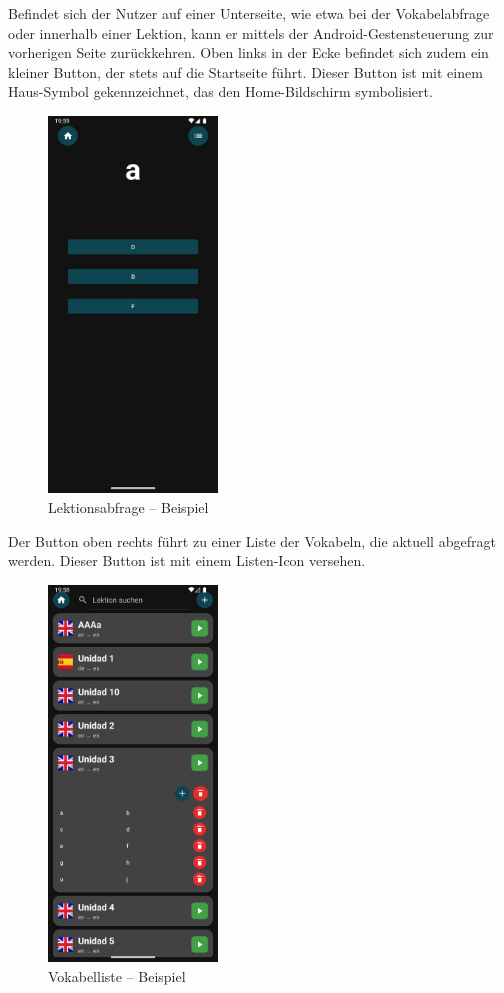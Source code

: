 \documentclass[12pt,a4paper]{article}
\begin{document}
Befindet sich der Nutzer auf einer Unterseite, wie etwa bei der Vokabelabfrage oder innerhalb einer Lektion, kann er mittels der Android-Gestensteuerung zur vorherigen Seite zurückkehren. Oben links in der Ecke befindet sich zudem ein kleiner Button, der stets auf die Startseite führt. Dieser Button ist mit einem Haus-Symbol gekennzeichnet, das den Home-Bildschirm symbolisiert.

\begin{figure}[H]
    \centering
    \includegraphics[width=0.4\textwidth]{showcase/guess.png}
    \caption{Lektionsabfrage – Beispiel}
    \label{fig:festes_bild}
\end{figure}

Der Button oben rechts führt zu einer Liste der Vokabeln, die aktuell abgefragt werden. Dieser Button ist mit einem Listen-Icon versehen.

\begin{figure}[H]
    \centering
    \includegraphics[width=0.4\textwidth]{showcase/Vokabeln.png}
    \caption{Vokabelliste – Beispiel}
    \label{fig:festes_bild}
\end{figure}
\end{document}
